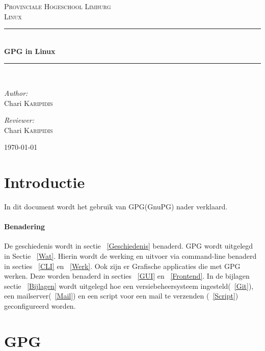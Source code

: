 \documentclass[12pt]{article}
\newcommand{\HRule}{\rule{\linewidth}{0.2mm}}
\begin{document}
	\begin{titlepage}
		\begin{center}
			\textsc{\LARGE Provinciale Hogeschool Limburg}\\[1.5cm]
			\textsc{\large Linux}\\[0.5cm]
			\HRule \\[0.4cm]
			{\huge \bfseries GPG in Linux}\\[0.4cm]
			\HRule \\[1.5cm]
			
			\begin{minipage}{0.4\textwidth}
			\begin{flushleft} \large
			\emph{Author:}\\
			Chari \textsc{Karipidis} 
			\end{flushleft}
			\end{minipage}
			\begin{minipage}{0.4\textwidth}
			\begin{flushright} \large
			\emph{Reviewer:}\\
			Chari \textsc{Karipidis} 
			\end{flushright}
			\end{minipage}
			\vfill
			{\large \today}
		\end{center}
	\end{titlepage}

	\newpage
	\tableofcontents
	
	\newpage
		\section{Introductie}
			In dit document wordt het gebruik van GPG(GnuPG) nader verklaard.

		\paragraph{Benadering}
			De geschiedenis wordt in sectie ~\ref{Geschiedenis} benaderd.
			GPG wordt uitgelegd in Sectie ~\ref{Wat}.
			Hierin wordt de werking en uitvoer via command-line benaderd in secties ~\ref{CLI} en ~\ref{Werk}.
			Ook zijn er Grafische applicaties die met GPG werken. Deze worden benaderd in secties ~\ref{GUI} en ~\ref{Frontend}.
			In de bijlagen sectie ~\ref{Bijlagen} wordt uitgelegd hoe een versiebeheersysteem ingesteld(~\ref{Git}), een mailserver(~\ref{Mail}) 
			en een script voor een mail te verzenden (~\ref{Script}) geconfigureerd worden.
			

		\newpage
		\section{GPG}\label{GPG}
\end{document}

